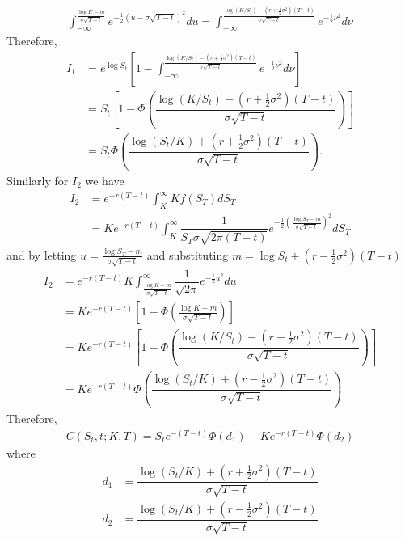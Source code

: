 \begin{align*}
	\displaystyle\int_{-\infty}^{\frac{\log K-m}{\sigma\sqrt{T-t}}}e^{-\frac{1}{2}\left(u-\sigma\sqrt{T-t}\right)^2}du = \displaystyle\int_{-\infty}^{\frac{\log(K/S_t)-(r+\frac{1}{2}\sigma^2)(T-t)}{\sigma\sqrt{T-t}}}e^{-\frac{1}{2}\nu^2}d\nu
\end{align*}
Therefore, 
\begin{align*}
	I_1&=e^{\log S_t}\left[1-\displaystyle\int_{-\infty}^{\frac{\log(K/S_t)-(r+\frac{1}{2}\sigma^2)(T-t)}{\sigma\sqrt{T-t}}}e^{-\frac{1}{2}\nu^2}d\nu\right]\\
	&=S_t\left[1-\Phi\left(\dfrac{\log(K/S_t)-(r+\frac{1}{2}\sigma^2)(T-t)}{\sigma\sqrt{T-t}}\right)\right]\\
	&=S_t\Phi\left(\dfrac{\log(S_t/K)+(r+\frac{1}{2}\sigma^2)(T-t)}{\sigma\sqrt{T-t}}\right).
\end{align*}
Similarly for $I_2$ we have
\begin{align*}
 I_2&=e^{-r(T-t)} \displaystyle \int_{K}^{\infty}Kf(S_T)dS_T\\
 	&=Ke^{-r(T-t)} \displaystyle \int_{K}^{\infty}\dfrac{1}{S_T\sigma\sqrt{2\pi(T-t)}}e^{-\frac{1}{2}\left(\frac{\log S_T-m}{\sigma\sqrt{T-t}}\right)^2}dS_T
\end{align*}
and by letting  $u=\frac{\log S_T-m}{\sigma\sqrt{T-t}}$ and substituting $m=\log S_t+(r-\frac{1}{2}\sigma^2)(T-t)$ \\
\begin{align*}
I_2&=e^{-r(T-t)}K \displaystyle \int_{\frac{\log K-m}{\sigma\sqrt{T-t}}}^{\infty}\dfrac{1}{\sqrt{2\pi}}e^{-\frac{1}{2}u^2}du\\
	&=Ke^{-r(T-t)}\left[1-\Phi\left(\frac{\log K-m}{\sigma\sqrt{T-t}}\right)\right]\\
	&=Ke^{-r(T-t)}\left[1-\Phi\left(\dfrac{\log(K/S_t)-(r-\frac{1}{2}\sigma^2)(T-t)}{\sigma\sqrt{T-t}}\right)\right]\\
	&=Ke^{-r(T-t)}\Phi\left(\dfrac{\log(S_t/K)+(r-\frac{1}{2}\sigma^2)(T-t)}{\sigma\sqrt{T-t}}\right)
\end{align*}
Therefore, 
\begin{align}
	C(S_t,t;K,T)=S_te^{-(T-t)}\Phi(d_1)-Ke^{-r(T-t)}\Phi(d_2) \label{eqBS}
\end{align}
where 
\begin{align*}
d_1&=\dfrac{\log(S_t/K)+(r+ \frac{1}{2}\sigma^2)(T-t)}{\sigma \sqrt{T-t}}\\
d_2&=\dfrac{\log(S_t/K)+(r- \frac{1}{2}\sigma^2)(T-t)}{\sigma \sqrt{T-t}}
\end{align*}

